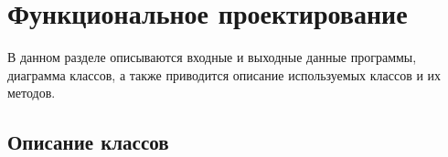 \section{Функциональное проектирование}
\label{sec:software}


В данном разделе описываются входные и выходные данные программы, диаграмма классов, а также приводится описание используемых классов и их методов.






\subsection{Описание классов}




